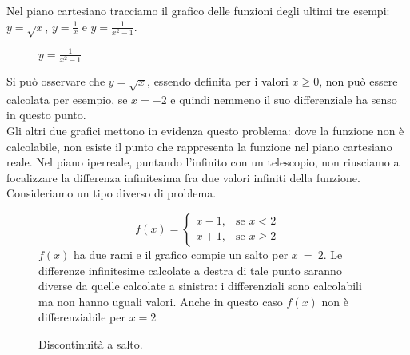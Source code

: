 Nel piano cartesiano tracciamo il grafico delle funzioni degli ultimi 
tre esempi: $y=\sqrt{x}$, $y=\frac{1}{x}$ e $y=\frac{1}{x^2-1}$.
\begin{figure}[h]
\begin{inaccessibleblock}
 \begin{center}
 \begin{minipage}[]{.23 \textwidth}
  \vspace*{4mm} 
  \radice
  \caption{$y=\sqrt{x}$}
 \end{minipage} 
 \begin{minipage}[]{.37 \textwidth}
  \iperbole
  \caption{$y=\frac{1}{x}$}
 \end{minipage} 
 \begin{minipage}[]{.37 \textwidth}
  \iperbolequad
  \caption{$y=\frac{1}{x^2-1}$}
 \end{minipage}
 \end{center}
\end{inaccessibleblock}
\label{fig:diff01_grafici}
\end{figure}

Si può osservare che $y=\sqrt{x}$, essendo definita per i valori $x\ge 0$, 
non può essere calcolata per esempio, se $x=-2$ e quindi nemmeno il suo 
differenziale ha senso in questo punto.\\
Gli altri due grafici mettono in evidenza questo problema: dove la funzione 
non è calcolabile, non esiste il punto che rappresenta la funzione nel piano 
cartesiano reale. Nel piano iperreale, puntando l'infinito con un telescopio,
non riusciamo a focalizzare la differenza infinitesima fra due valori infiniti
della funzione.
\newpage
Consideriamo un tipo diverso di problema.

\begin{figure}[h]
\begin{inaccessibleblock}
 \begin{center}
 \begin{minipage}[]{.38 \textwidth}
  \salto
  \caption{Discontinuità a salto.}
 \end{minipage} 
 \hfill
 \begin{minipage}[]{.58 \textwidth}
\[
f(x)=\begin{cases} 
x-1, & \mbox{se }x<2 \\ 
x+1, & \mbox{se }x\ge 2
\end{cases}
\]
$f(x)$ ha due rami e il grafico compie un salto per $x~=~2$. Le differenze
infinitesime calcolate a destra di tale punto saranno diverse da quelle 
calcolate a sinistra: i differenziali sono calcolabili ma non hanno
uguali valori. Anche in questo caso $f(x)$ non è differenziabile per $x=2$
 \end{minipage}
 \end{center}
\end{inaccessibleblock}

\label{fig:diff01_salto}
\end{figure}


